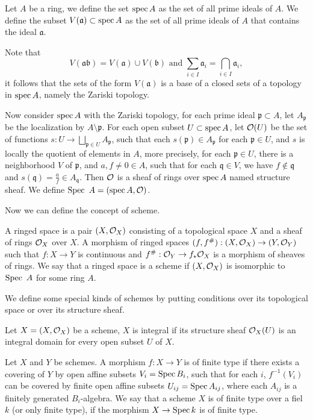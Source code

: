 \documentclass[
	oldfontcommands,
	sumario=abnt-6027-2012,
	12pt,			%
	openright,		%
	oneside,		%
	a4paper,		%
	english,		%
	brazil			%
	]{imecc-unicamp}
\begin{document}
\begin{definition}
	Let $A$ be a ring, we define the set $\operatorname{spec} A$ as the set of all prime ideals of $A$. We define the subset $V(\mathfrak a)\subset \operatorname{spec} A$ as the set of all prime ideals of $A$ that contains the ideal $\mathfrak a$.
\end{definition}
Note that $$V(\mathfrak {ab})=V(\mathfrak{a})\cup V(\mathfrak{b}) \text{ and } \sum_{i\in I}\mathfrak a_i=\bigcap_{i\in I}\mathfrak a_i,$$
it follows that the sets of the form $V(\mathfrak a)$ is a base of a closed sets of a topology in $\operatorname{spec} A$, namely the Zariski topology.

Now consider $\operatorname{spec} A$ with the Zariski topology, for each prime ideal $\mathfrak p \subset A$, let $A_\mathfrak p$ be the localization by $A\setminus \mathfrak p$. For each open subset $U\subset \operatorname{spec} A$, let ${\mathcal O}(U)$ be the set of functions $ s:U\rightarrow \bigsqcup_{\mathfrak{p}\in U}A_\mathfrak p$, such that each $s(\mathfrak p)\in A_\mathfrak{p}$ for each $\mathfrak p \in U$, and $s$ is locally the quotient of elements in $A$, more precisely, for each $\mathfrak p\in U$, there is a neighborhood $V$ of $\mathfrak p$, and $a,f\neq 0\in A$, such that for each $\mathfrak q\in V$, we have $f\notin \mathfrak q$ and $s(\mathfrak q)=\frac{a}{f}\in A_\mathfrak q$. Then ${\mathcal O}$ is a sheaf of rings over $\operatorname{spec} A$ named structure sheaf. We define $\operatorname{Spec}~A=(\operatorname{spec} A,{\mathcal O})$.

Now we can define the concept of scheme.

\begin{definition}
	A ringed space is a pair $(X,{\mathcal O}_X)$ consisting of a topological space $X$ and a sheaf of rings ${\mathcal O}_X$ over $X$. A morphism of ringed spaces $(f,f^\#):(X,{\mathcal O}_X)\rightarrow (Y,{\mathcal O}_Y)$ such that $f:X\rightarrow Y$ is continuous and $f^\#:{\mathcal O}_Y\rightarrow f_*{\mathcal O}_X$ is a morphism of sheaves of rings. We say that a ringed space is a scheme if $(X,{\mathcal O}_X)$ is isomorphic to $\operatorname{Spec}~A$ for some ring $A$.
\end{definition}

We define some special kinds of schemes by putting conditions over its topological space or over its structure sheaf.

Let $X=(X,{\mathcal O}_X)$ be a scheme, $X$ is integral if its structure sheaf ${\mathcal O}_X(U)$ is an integral domain for every open subset $U$ of $X$.

Let $X$ and $Y$ be schemes. A morphism $f: X\rightarrow Y$ is of finite type if there exists a covering of $Y$ by open affine subsets $V_i=\operatorname{Spec} B_i$, such that for each $i$, $f^{-1}(V_i)$ can be covered by finite open affine subsets $U_{ij}=\operatorname{Spec} A_{ij}$, where each $A_{ij}$ is a finitely generated $B_i$-algebra. We say that a scheme $X$ is of finite type over a fiel $k$ (or only finite type), if the morphism $X\rightarrow \operatorname{Spec} k$ is of finite type.
\end{document}
